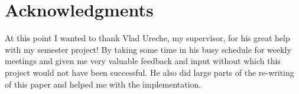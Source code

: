 \section{Acknowledgments}

At this point I wanted to thank Vlad Ureche, my supervisor, for his great help with my semester project! By taking some time in his busy schedule for weekly meetings and given me very valuable feedback and input without which this project would not have been successful. He also did large parts of the re-writing of this paper and helped me with the implementation.